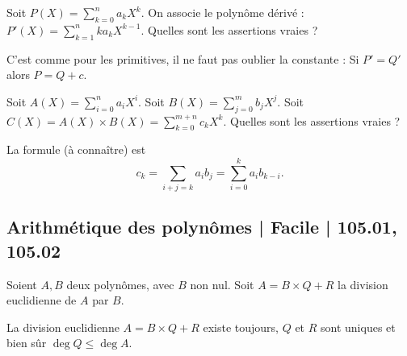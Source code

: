 \begin{question}

Soit $P(X) = \sum_{k=0}^n a_k X^k$. On associe le polynôme dérivé :
$P'(X) = \sum_{k=1}^n ka_k X^{k-1}$. Quelles sont les assertions vraies ?
\begin{answers}



\end{answers}
\begin{explanations}
C'est comme pour les primitives, il ne faut pas oublier la constante :
Si $P'=Q'$ alors $P=Q +c$.
\end{explanations}
\end{question}



\begin{question}

Soit $A(X) = \sum_{i=0}^n a_i X^i$.
Soit $B(X) = \sum_{j=0}^m b_j X^j$.
Soit $C(X) = A(X) \times B(X) = \sum_{k=0}^{m+n} c_k X^k$.
Quelles sont les assertions vraies ?
\begin{answers}


    
\end{answers}
\begin{explanations}
La formule (à connaître) est 
$$c_k = \sum_{i+j=k} a_ib_j = \sum_{i=0}^k a_ib_{k-i}.$$
\end{explanations}
\end{question}


\subsection{Arithmétique des polynômes | Facile | 105.01, 105.02}


\begin{question}

Soient $A,B$ deux polynômes, avec $B$ non nul. 
Soit $A = B \times Q + R$ la division euclidienne de $A$ par $B$. 
\begin{answers}



\end{answers}
\begin{explanations}
La division euclidienne $A = B \times Q + R$ existe toujours, $Q$ et $R$ sont uniques et bien sûr $\deg Q \le \deg A$.
\end{explanations}
\end{question}


